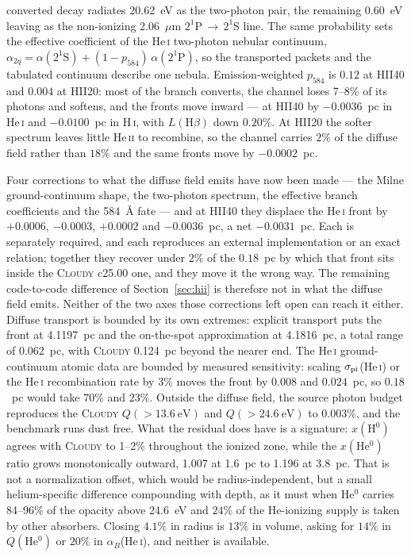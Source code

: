 \documentclass[twocolumn,linenumbers]{aastex702}
\newcommand{\HI}{H\,\textsc{i}}
\newcommand{\HeI}{He\,\textsc{i}}
\newcommand{\HeII}{He\,\textsc{ii}}
\begin{document}
converted decay radiates 20.62~eV as the two-photon pair, the remaining
0.60~eV leaving as the non-ionizing 2.06~$\mu$m $2^1$P\,$\to$\,$2^1$S line.
The same probability sets the effective coefficient of the \HeI{} two-photon
nebular continuum,
$\alpha_{2q} = \alpha(2^1\mathrm{S}) + (1-p_{584})\,\alpha(2^1\mathrm{P})$,
so the transported packets and the tabulated continuum describe one nebula.
Emission-weighted $p_{584}$ is $0.12$ at HII40 and $0.004$ at HII20: most of
the branch converts, the channel loses 7--8\% of its photons and softens,
and the fronts move inward --- at HII40 by $-0.0036$~pc in \HeI{} and
$-0.0100$~pc in \HI{}, with $L(\mathrm{H}\beta)$ down $0.20\%$.  At HII20
the softer spectrum leaves little \HeII{} to recombine, so the channel
carries $2\%$ of the diffuse field rather than $18\%$ and the same fronts
move by $-0.0002$~pc.

Four corrections to what the diffuse field emits have now been made --- the
Milne ground-continuum shape, the \citet{drake1969} two-photon spectrum, the
effective branch coefficients and the 584~\AA{} fate --- and at HII40 they
displace the \HeI{} front by $+0.0006$, $-0.0003$, $+0.0002$ and
$-0.0036$~pc, a net $-0.0031$~pc.  Each is separately required, and each
reproduces an external implementation or an exact relation; together they
recover under $2\%$ of the $0.18$~pc by which that front sits inside the
\textsc{Cloudy} c25.00 one, and they move it the wrong way.  The remaining
code-to-code difference of Section~\ref{sec:hii} is therefore not in what
the diffuse field emits.  Neither of the two axes those corrections left open
can reach it either.  Diffuse transport is bounded by its own extremes:
explicit transport puts the front at 4.1197~pc and the on-the-spot
approximation at 4.1816~pc, a total range of 0.062~pc, with \textsc{Cloudy}
0.124~pc beyond the nearer end.  The \HeI{} ground-continuum atomic data are
bounded by measured sensitivity: scaling $\sigma_{\rm pi}$(\HeI) or the \HeI{}
recombination rate by $3\%$ moves the front by $0.008$ and $0.024$~pc, so
$0.18$~pc would take $70\%$ and $23\%$.  Outside the diffuse field, the
source photon budget reproduces the \textsc{Cloudy}
$Q({>}13.6~\mathrm{eV})$ and $Q({>}24.6~\mathrm{eV})$ to $0.003\%$, and the
benchmark runs dust free.
What the residual does have is a signature: $x(\mathrm{H^{0}})$ agrees with
\textsc{Cloudy} to 1--2\% throughout the ionized zone, while the
$x(\mathrm{He^{0}})$ ratio grows monotonically outward, 1.007 at 1.6~pc to
1.196 at 3.8~pc.  That is not a normalization offset, which would be
radius-independent, but a small helium-specific difference compounding with
depth, as it must when He$^{0}$ carries 84--96\% of the opacity above
24.6~eV and $24\%$ of the He-ionizing supply is taken by other absorbers.
Closing $4.1\%$ in radius is $13\%$ in volume, asking for $14\%$
in $Q(\mathrm{He^{0}})$ or $20\%$ in $\alpha_B$(\HeI), and neither is
available.
\end{document}
